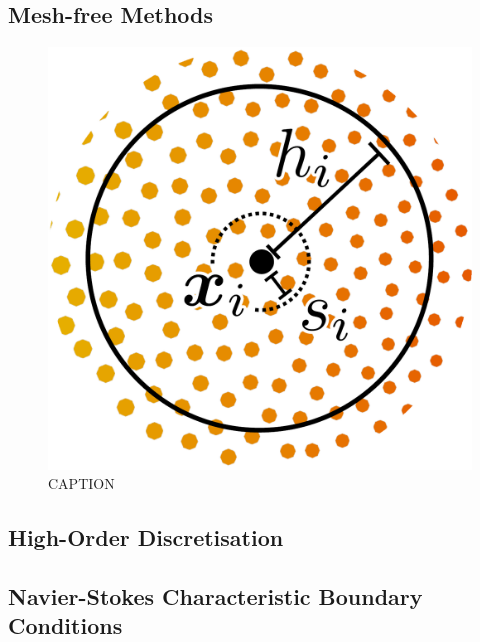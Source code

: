 
\subsection{Mesh-free Methods}

\cite{monaghan1992SmoothedParticleHydrodynamics, vacondio2021GrandChallengesSmoothed}


\begin{figure}[t]
\centering
\includegraphics[scale=0.175]{assets/imgs/labfm-stencil-drawn_simple.pdf}
\caption{CAPTION}
\label{fig:labfm-stencil}
\end{figure}
        




\subsection{High-Order Discretisation}




\subsection{Navier-Stokes Characteristic Boundary Conditions}

\cite{thompson1987TimeDependentBoundary, thompson1990TimeDependentBoundaryConditions, poinsot1992BoundaryConditionsDirect, poinsot2005TheoreticalNumericalCombustion, sutherland2003ImprovedBoundaryConditions}

